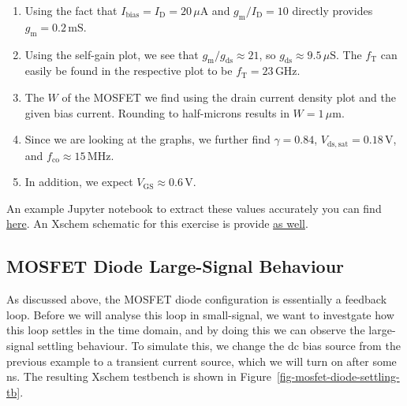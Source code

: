 \documentclass[
  a4paper,
  DIV=11,
  numbers=noendperiod]{scrartcl}
\providecommand{\tightlist}{%
  \setlength{\itemsep}{0pt}\setlength{\parskip}{0pt}}\usepackage{longtable,booktabs,array}
\begin{document}
\begin{tcolorbox}[enhanced jigsaw, breakable, title=\textcolor{quarto-callout-tip-color}{\faLightbulb}\hspace{0.5em}{Solution: MOSFET Diode Sizing}, left=2mm, bottomrule=.15mm, opacitybacktitle=0.6, opacityback=0, colframe=quarto-callout-tip-color-frame, leftrule=.75mm, bottomtitle=1mm, colbacktitle=quarto-callout-tip-color!10!white, toprule=.15mm, rightrule=.15mm, toptitle=1mm, titlerule=0mm, arc=.35mm, colback=white, coltitle=black]

\begin{enumerate}
\def\labelenumi{\arabic{enumi}.}
\tightlist
\item
  Using the fact that
  \(I_\mathrm{bias} = I_\mathrm{D} = 20\,\mu\text{A}\) and
  \(g_\mathrm{m}/I_\mathrm{D}= 10\) directly provides
  \(g_\mathrm{m}= 0.2\,\text{mS}\).
\item
  Using the self-gain plot, we see that
  \(g_\mathrm{m}/g_\mathrm{ds}\approx 21\), so
  \(g_\mathrm{ds}\approx 9.5\,\mu\text{S}\). The \(f_\mathrm{T}\) can
  easily be found in the respective plot to be
  \(f_\mathrm{T} = 23\,\text{GHz}\).
\item
  The \(W\) of the MOSFET we find using the drain current density plot
  and the given bias current. Rounding to half-microns results in
  \(W = 1\,\mu\text{m}\).
\item
  Since we are looking at the graphs, we further find \(\gamma = 0.84\),
  \(V_\mathrm{ds,sat} = 0.18\,\text{V}\), and
  \(f_\mathrm{co} \approx 15\,\text{MHz}\).
\item
  In addition, we expect \(V_\mathrm{GS}\approx 0.6\,\text{V}\).
\end{enumerate}

An example Jupyter notebook to extract these values accurately you can
find \href{./sizing/sizing_mosfet_diode.ipynb}{here}. An Xschem
schematic for this exercise is provide
\href{./xschem/mosfet_diode_sizing.sch}{as well}.

\end{tcolorbox}

\subsection{MOSFET Diode Large-Signal
Behaviour}\label{mosfet-diode-large-signal-behaviour}

As discussed above, the MOSFET diode configuration is essentially a
feedback loop. Before we will analyse this loop in small-signal, we want
to investgate how this loop settles in the time domain, and by doing
this we can observe the large-signal settling behaviour. To simulate
this, we change the dc bias source from the previous example to a
transient current source, which we will turn on after some ns. The
resulting Xschem testbench is shown in
Figure~\ref{fig-mosfet-diode-settling-tb}.
\end{document}
